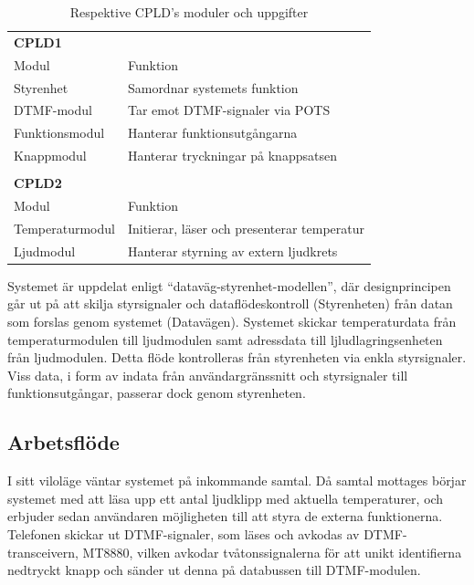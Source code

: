 \documentclass[a4paper,11pt]{article}
\begin{document}
	\begin{table} [H]
		
		\caption{Respektive CPLD's moduler och uppgifter} 
		\label{tab:uppdelningstabell}
	\begin{tabular}{l l}
		
		{\bf CPLD1} \\
		Modul	& Funktion	\\
		\hline
		Styrenhet	& Samordnar systemets funktion \\
		DTMF-modul & Tar emot DTMF-signaler via POTS \\
		Funktionsmodul	& Hanterar funktionsutgångarna \\
		Knappmodul	& Hanterar tryckningar på knappsatsen \\
		\\
		{\bf CPLD2} \\
		Modul	& Funktion	\\
		\hline
		Temperaturmodul	& Initierar, läser och presenterar temperatur \\
		Ljudmodul	& Hanterar styrning av extern ljudkrets \\
		
	\end{tabular}
	\end{table}
	
	Systemet är uppdelat enligt ``dataväg-styrenhet-modellen'', där designprincipen går ut på att skilja styrsignaler
	och dataflödeskontroll (Styrenheten) från datan som forslas genom systemet (Datavägen). Systemet skickar temperaturdata från temperaturmodulen till ljudmodulen samt adressdata till ljludlagringsenheten från ljudmodulen. Detta flöde kontrolleras från styrenheten via
	enkla styrsignaler. Viss data, i form av indata från användargränssnitt och styrsignaler till funktionsutgångar, passerar dock genom styrenheten.

	\subsection{Arbetsflöde}

I sitt viloläge väntar systemet på inkommande samtal. Då samtal mottages börjar systemet med att läsa upp ett antal ljudklipp med aktuella temperaturer, och erbjuder sedan användaren möjligheten till att styra de externa funktionerna. Telefonen skickar ut DTMF-signaler, som läses och avkodas av DTMF-transceivern, MT8880, vilken avkodar tvåtonssignalerna för att unikt identifierna nedtryckt knapp och sänder ut denna på databussen till DTMF-modulen. 
\end{document}
